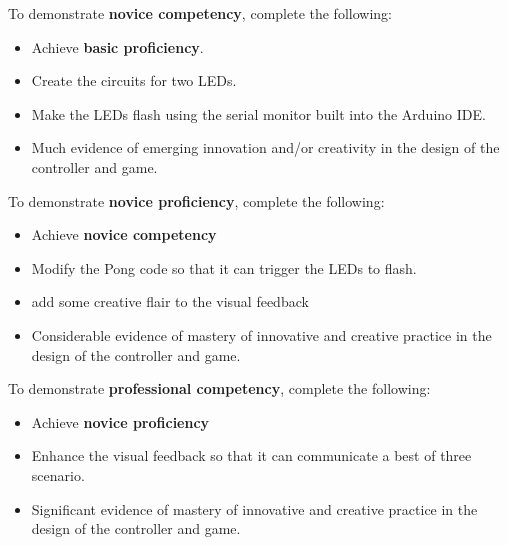 \documentclass{../../../fal_assignment}
\begin{document}
To demonstrate \textbf{novice competency}, complete the following:
\begin{itemize}
	\item Achieve \textbf{basic proficiency}.
	\item Create the circuits for two LEDs.
	\item Make the LEDs flash using the serial monitor built into the Arduino IDE.
	\item Much evidence of emerging innovation and/or creativity in the design of the controller and game.
\end{itemize}

To demonstrate \textbf{novice proficiency}, complete the following:
\begin{itemize}
	\item Achieve \textbf{novice competency}
	\item Modify the Pong code so that it can trigger the LEDs to flash.
	\item add some creative flair to the visual feedback
	\item Considerable evidence of mastery of innovative and creative practice in the design of the controller and game.
\end{itemize}

To demonstrate \textbf{professional competency}, complete the following:
\begin{itemize}
	\item Achieve \textbf{novice proficiency}
	\item Enhance the visual feedback so that it can communicate a best of three scenario.
	\item Significant evidence of mastery of innovative and creative practice  in the design of the controller and game.
\end{itemize}
\end{document}
